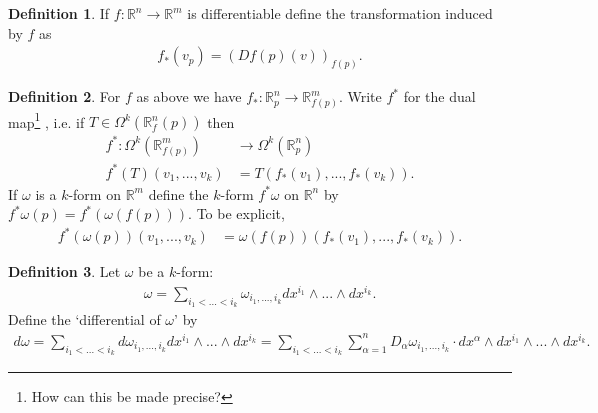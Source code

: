 \documentclass[20pt]{article}
\theoremstyle{plain}
\newtheorem{theorem}{Theorem}
\theoremstyle{definition}
\newtheorem{definition}{Definition}
\newcommand{\reals}{\mathbb{R}}
\begin{document}
  \begin{definition}
    If $f: \reals^n \to \reals^m$ is differentiable define the transformation induced by $f$ as
    \begin{align*}
      f_*(v_p) = (Df(p)(v))_{f(p)}.
    \end{align*}
  \end{definition}

  \begin{definition}
    For $f$ as above we have $f_* : \reals^n_p \to \reals^m_{f(p)}$. 
    Write $f^*$ for the dual map\footnote{How can this be made precise?}
    , i.e. if $T \in \Omega^k(\reals^n_f(p))$ then
    \begin{align*}
      f^* : \Omega^k(\reals^m_{f(p)}) &\to \Omega^k(\reals^n_p)\\
      f^*(T)(v_1, ..., v_k) &= T(f_*(v_1), ..., f_*(v_k)).
    \end{align*}
    If $\omega$ is a $k$-form on $\reals^m$ define the $k$-form $f^*\omega$ on $\reals^n$ by $f^*\omega(p) = f^*(\omega(f(p))).$
    To be explicit, 
    \begin{align*}
     f^*(\omega(p))(v_1, ..., v_k) &= \omega(f(p))(f_*(v_1), ..., f_*(v_k)).      
    \end{align*} 
  \end{definition}




  \begin{definition}
    Let $\omega$ be a $k$-form:
    \begin{align*}
      \omega = \sum_{i_1 < ... < i_k} \omega_{i_1,...,i_k}dx^{i_1} \wedge ... \wedge dx^{i_k}.
    \end{align*}
    Define the `differential of $\omega$' by 
    \begin{align*}
      d\omega = 
      \sum_{i_1 < ... < i_k} d\omega_{i_1,...,i_k}dx^{i_1} \wedge ... \wedge dx^{i_k} = 
      \sum_{i_1 < ... < i_k} \sum_{\alpha = 1}^n D_\alpha \omega_{i_1,...,i_k}  \cdot dx^\alpha \wedge dx^{i_1}\wedge ... \wedge dx^{i_k}.
    \end{align*}
  \end{definition}
\end{document}
